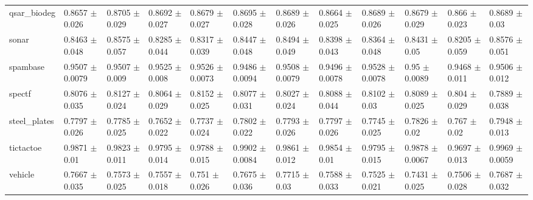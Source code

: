 \begin{tabular}{llllllllllll}
qsar\_biodeg & 0.8657 $\pm$ 0.026 & 0.8705 $\pm$ 0.029 & 0.8692 $\pm$ 0.027 & 0.8679 $\pm$ 0.027 & 0.8695 $\pm$ 0.028 & 0.8689 $\pm$ 0.026 & 0.8664 $\pm$ 0.025 & 0.8689 $\pm$ 0.026 & 0.8679 $\pm$ 0.029 & 0.866 $\pm$ 0.023 & 0.8689 $\pm$ 0.03 \\
sonar & 0.8463 $\pm$ 0.048 & 0.8575 $\pm$ 0.057 & 0.8285 $\pm$ 0.044 & 0.8317 $\pm$ 0.039 & 0.8447 $\pm$ 0.048 & 0.8494 $\pm$ 0.049 & 0.8398 $\pm$ 0.043 & 0.8364 $\pm$ 0.048 & 0.8431 $\pm$ 0.05 & 0.8205 $\pm$ 0.059 & 0.8576 $\pm$ 0.051 \\
spambase & 0.9507 $\pm$ 0.0079 & 0.9507 $\pm$ 0.009 & 0.9525 $\pm$ 0.008 & 0.9526 $\pm$ 0.0073 & 0.9486 $\pm$ 0.0094 & 0.9508 $\pm$ 0.0079 & 0.9496 $\pm$ 0.0078 & 0.9528 $\pm$ 0.0078 & 0.95 $\pm$ 0.0089 & 0.9468 $\pm$ 0.011 & 0.9506 $\pm$ 0.012 \\
spectf & 0.8076 $\pm$ 0.035 & 0.8127 $\pm$ 0.024 & 0.8064 $\pm$ 0.029 & 0.8152 $\pm$ 0.025 & 0.8077 $\pm$ 0.031 & 0.8027 $\pm$ 0.024 & 0.8088 $\pm$ 0.044 & 0.8102 $\pm$ 0.03 & 0.8089 $\pm$ 0.025 & 0.804 $\pm$ 0.029 & 0.7889 $\pm$ 0.038 \\
steel\_plates & 0.7797 $\pm$ 0.026 & 0.7785 $\pm$ 0.025 & 0.7652 $\pm$ 0.022 & 0.7737 $\pm$ 0.024 & 0.7802 $\pm$ 0.022 & 0.7793 $\pm$ 0.026 & 0.7797 $\pm$ 0.026 & 0.7745 $\pm$ 0.025 & 0.7826 $\pm$ 0.02 & 0.767 $\pm$ 0.02 & 0.7948 $\pm$ 0.013 \\
tictactoe & 0.9871 $\pm$ 0.01 & 0.9823 $\pm$ 0.011 & 0.9795 $\pm$ 0.014 & 0.9788 $\pm$ 0.015 & 0.9902 $\pm$ 0.0084 & 0.9861 $\pm$ 0.012 & 0.9854 $\pm$ 0.01 & 0.9795 $\pm$ 0.015 & 0.9878 $\pm$ 0.0067 & 0.9697 $\pm$ 0.013 & 0.9969 $\pm$ 0.0059 \\
vehicle & 0.7667 $\pm$ 0.035 & 0.7573 $\pm$ 0.025 & 0.7557 $\pm$ 0.018 & 0.751 $\pm$ 0.026 & 0.7675 $\pm$ 0.036 & 0.7715 $\pm$ 0.03 & 0.7588 $\pm$ 0.033 & 0.7525 $\pm$ 0.021 & 0.7431 $\pm$ 0.025 & 0.7506 $\pm$ 0.028 & 0.7687 $\pm$ 0.032 \\
\bottomrule
\end{tabular}
